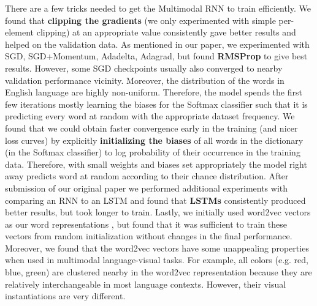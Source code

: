 \documentclass[10pt,twocolumn,letterpaper]{article}
\begin{document}
There are a few tricks needed to get the Multimodal RNN to train efficiently. We found that \textbf{clipping the gradients} (we only experimented with simple per-element clipping) at an appropriate value consistently gave better results and helped on the validation data. As mentioned in our paper, we experimented with SGD, SGD+Momentum, Adadelta, Adagrad, but found \textbf{RMSProp} to give best results. However, some SGD checkpoints usually also converged to nearby validation performance vicinity. Moreover, the distribution of the words in English language are highly non-uniform. Therefore, the model spends the first few iterations mostly learning the biases for the Softmax classifier such that it is predicting every word at random with the appropriate dataset frequency. We found that we could obtain faster convergence early in the training (and nicer loss curves) by explicitly \textbf{initializing the biases} of all words in the dictionary (in the Softmax classifier) to log probability of their occurrence in the training data. Therefore, with small weights and biases set appropriately the model right away predicts word at random according to their chance distribution. After submission of our original paper we performed additional experiments with comparing an RNN to an LSTM and found that \textbf{LSTMs} consistently produced better results, but took longer to train. Lastly, we initially used word2vec vectors as our word representations , but found that it was sufficient to train these vectors from random initialization without changes in the final performance. Moreover, we found that the word2vec vectors have some unappealing properties when used in multimodal language-visual tasks. For example, all colors (e.g. red, blue, green) are clustered nearby in the word2vec representation because they are relatively interchangeable in most language contexts. However, their visual instantiations are very different.

\clearpage
\end{document}
